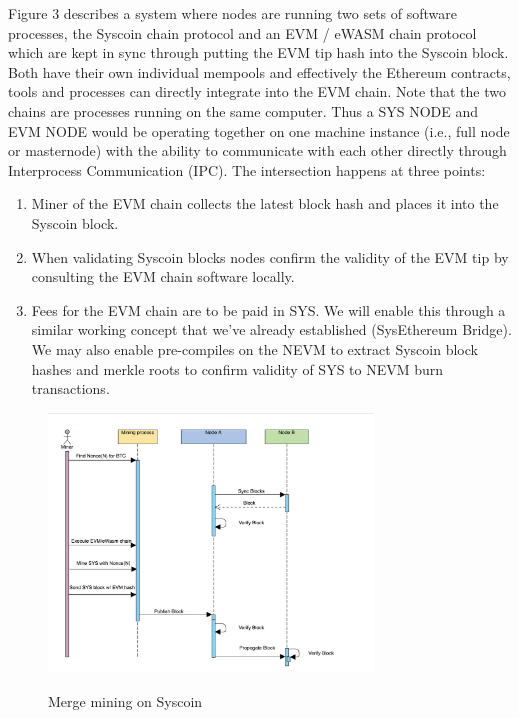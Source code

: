 \documentclass[peerreview]{ieeesyscoin}
\begin{document}
Figure 3 describes a system where nodes are running two sets of software processes, the Syscoin chain protocol and an EVM / eWASM chain protocol which are kept in sync through putting the EVM tip hash into the Syscoin block. Both have their own individual mempools and effectively the Ethereum contracts, tools and processes can directly integrate into the EVM chain. Note that the two chains are processes running on the same computer. Thus a SYS NODE and EVM NODE would be operating together on one machine instance (i.e., full node or masternode) with the ability to communicate with each other directly through Interprocess Communication (IPC). The intersection happens at three points:

\begin{enumerate}
\item Miner of the EVM chain collects the latest block hash and places it into the Syscoin block.
\item When validating Syscoin blocks nodes confirm the validity of the EVM tip by consulting the EVM chain software locally.
\item Fees for the EVM chain are to be paid in SYS. We will enable this through a similar working concept that we’ve already established (SysEthereum Bridge). We may also enable pre-compiles on the NEVM to extract Syscoin block hashes and merkle roots to confirm validity of SYS to NEVM burn transactions.
\end{enumerate}

\begin{figure}[h!]
\includegraphics[width=3.4in]{img/fig_6.png}
\label{fig:tech_stack}
\caption{Merge mining on Syscoin} 
\end{figure} 
\end{document}
